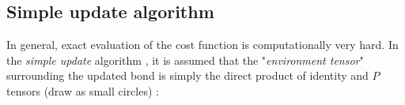 \documentclass[11pt]{article}
\begin{document}
\subsection{Simple update algorithm}

In general, exact evaluation of the cost function is computationally very hard. In the \textit{simple update} algorithm \cite{Jiang2008}, it is assumed that the "\emph{environment tensor}" surrounding the updated bond is simply the direct product of identity and $P$ tensors (draw as small circles) \cite{Gu2013}:
\newcommand{\rhoedgesA}[1]{
    \draw[#1] (0,1) -- ++(0.5,0);
    \draw[#1] (1,0) -- ++(0,0.5);
    \draw[#1] (1,1.5) -- ++(0,0.5);
}
\newcommand{\rhoedgesB}[1]{
    \draw[#1] (2.5,1) -- ++(0.5,0);
    \draw[#1] (2,0) -- ++(0,0.5);
    \draw[#1] (2,1.5) -- ++(0,0.5);
}
\def\rhoshift{0.6}
\newcommand{\rhowts}{
    \foreach \y in {0,2,3} {
    \foreach \x in {0,1,2} {
        \wt{\x+0.5}{\y}
    }}
    \foreach \x in {0,1,2,3} {
    \foreach \y in {0,1,2} {
        \ifnum\x=1
            \ifnum\y=0\else \ifnum\y=1\else
                \wt{\x}{\y+0.5}
            \fi \fi
        \else \ifnum\x=2
            \ifnum\y=0\else \ifnum\y=1\else
                \wt{\x}{\y+0.5}
            \fi \fi
            \else
                \wt{\x}{\y+0.5}
            \fi
        \fi
    }}
}
\newcommand{\drawrho}[1]{
    \def\mydrawT{#1}
    \foreach \x in {0,1,2,3} {
    \foreach \y in {0,1,2,3} {
        \pgfmathparse{\x + \y}
        \let\sumxy\pgfmathresult
        \ifnum\y=1
            \ifnum\x=1 \else \ifnum\x=2 \else
                \ifodd\sumxy
                    \mydrawT{\x}{\y}{green}
                \else
                    \mydrawT{\x}{\y}{blue}
                \fi
            \fi \fi 
        \else
            \ifodd\sumxy
                \mydrawT{\x}{\y}{green}
            \else
                \mydrawT{\x}{\y}{blue}
            \fi
        \fi
    }} \rhowts
}
\newcommand{\suenvA}{
    \begin{scope}
        \rhoedgesA{midarrow}
    \end{scope}
    \foreach \x/\y in {0/1, 1/0}{
        \draw (\x,\y) -- ++(\rhoshift, \rhoshift);
    }
    \foreach \x/\y in {1/2}{
        \draw (\x,\y) -- ++(\rhoshift, \rhoshift);
        \pmat{\x+\rhoshift/2}{\y+\rhoshift/2}
    }
    \begin{scope}[opacity=0.3,shift={(\rhoshift,\rhoshift)}]
        \rhoedgesA{midarrowrev}
    \end{scope}
}
\newcommand{\suenvB}{
    \begin{scope}
        \rhoedgesB{midarrow}
    \end{scope}
    \foreach \x/\y in {2/0}{
        \draw (\x,\y) -- ++(\rhoshift, \rhoshift);
    }
    \foreach \x/\y in {2/2, 3/1}{
        \draw (\x,\y) -- ++(\rhoshift, \rhoshift);
        \pmat{\x+\rhoshift/2}{\y+\rhoshift/2}
    }
    \begin{scope}[opacity=0.3,shift={(\rhoshift,\rhoshift)}]
        \rhoedgesB{midarrowrev}
    \end{scope}
}
\end{document}
